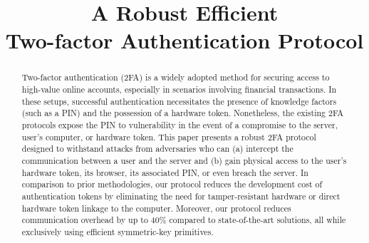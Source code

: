 \documentclass[sigconf, anonymous, review]{acmart}
\makeatletter
\theoremstyle{remark}
\DeclareRobustCommand\onedot{\futurelet\@let@token\@onedot}
\def\@onedot{\ifx\@let@token.\else.\null\fi\xspace}
\def\eg{\emph{e.g}\onedot} \def\Eg{\emph{E.g}\onedot}
\makeatother
\begin{document}
\newtheorem{claim}{Claim}[theorem]
\title{A Robust Efficient\\ Two-factor Authentication Protocol}


\author{}





\begin{abstract}

Two-factor authentication (2FA) is a widely adopted method for securing access to high-value online accounts, especially in scenarios involving financial transactions. In these setups, successful authentication necessitates the presence of knowledge factors (such as a PIN) and the possession of a hardware token. Nonetheless, the existing 2FA protocols expose the PIN to vulnerability in the event of a compromise to the server, user's computer, or hardware token. 
%
This paper presents a robust 2FA protocol designed to withstand attacks from adversaries who can (a) intercept the communication between a user and the server and (b) gain physical access to the user's hardware token, its browser, its associated PIN, or even breach the server. In comparison to prior methodologies, our protocol reduces the development cost of authentication tokens by eliminating the need for tamper-resistant hardware or direct hardware token linkage to the computer. Moreover, our protocol reduces communication overhead by up to 40\% compared to state-of-the-art solutions, all while exclusively using efficient symmetric-key primitives.







\end{abstract}
\end{document}
